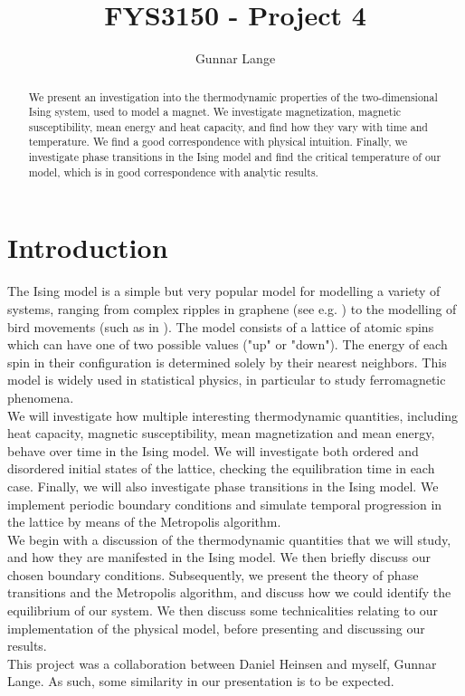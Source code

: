 \documentclass[a4paper, 10pt]{article}
\title{FYS3150 - Project 4}
\author{Gunnar Lange}
\begin{document}
\maketitle
\begin{abstract}
We present an investigation into the thermodynamic properties of the two-dimensional Ising system, used to model a magnet. We investigate magnetization, magnetic susceptibility, mean energy and heat capacity, and find how they vary with time and temperature. We find a good correspondence with physical intuition. Finally, we investigate phase transitions in the Ising model and find the critical temperature of our model, which is in good correspondence with analytic results.
\end{abstract}
\tableofcontents
\section{Introduction}
The Ising model is a simple but very popular model for modelling a variety of systems, ranging from complex ripples in graphene (see e.g. \cite{Graphene}) to the modelling of bird movements (such as in \cite{Birds}). The model consists of a lattice of atomic spins which can have one of two possible values ("up" or "down"). The energy of each spin in their configuration is determined solely by their nearest neighbors. This model is widely used in statistical physics, in particular to study ferromagnetic phenomena.\\
\linebreak
We will investigate how multiple interesting thermodynamic quantities, including heat capacity, magnetic susceptibility, mean magnetization and mean energy, behave over time in the Ising model. We will investigate both ordered and disordered initial states of the lattice, checking the equilibration time in each case. Finally, we will also investigate phase transitions in the Ising model. We implement periodic boundary conditions and simulate temporal progression in the lattice by means of the Metropolis algorithm.\\
\linebreak
We begin with a discussion of the thermodynamic quantities that we will study, and how they are manifested in the Ising model. We then briefly discuss our chosen boundary conditions. Subsequently, we present the theory of phase transitions and the Metropolis algorithm, and discuss how we could identify the equilibrium of our system. We then discuss some technicalities relating to our implementation of the physical model, before presenting and discussing our results.\\
\linebreak
This project was a collaboration between Daniel Heinsen and myself, Gunnar Lange. As such, some similarity in our presentation is to be expected.
\end{document}
